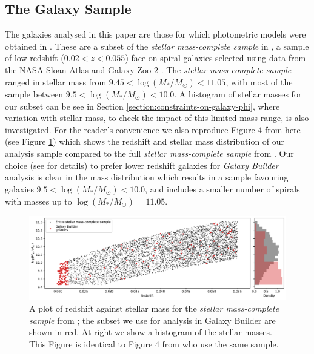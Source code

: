 \subsection{The Galaxy Sample}
The galaxies analysed in this paper are those for which photometric models were obtained in \citet{2020arXiv200610450L}. These are a subset of the \textit{stellar mass-complete sample} in \citet{2017MNRAS.472.2263H}, a sample of low-redshift ($0.02 < z < 0.055$) face-on spiral galaxies selected using data from the NASA-Sloan Atlas \citep{2011AJ....142...31B} and Galaxy Zoo 2 \citep{Willett2013:1308.3496v2}. The \textit{stellar mass-complete sample} ranged in stellar mass from $9.45 < \log(M_* / M_\odot) < 11.05$, with most of the sample between $9.5 < \log(M_* / M_\odot) < 10.0$. A histogram of stellar masses for our subset can be see in Section \ref{section:constraints-on-galaxy-phi}, where variation with stellar mass, to check the impact of this limited mass range, is also investigated. For the reader's convenience we also reproduce Figure 4 from \citet{2020arXiv200610450L} here (see Figure \ref{fig:stellarmass}) which shows the redshift and stellar mass distribution of our analysis sample compared to the full \textit{stellar mass-complete sample} from \citet{2017MNRAS.472.2263H}. Our choice (see \citet{2020arXiv200610450L} for details) to prefer lower redshift galaxies for {\it Galaxy Builder} analysis is clear in the mass distribution which results in a sample favouring galaxies $9.5 < \log(M_* / M_\odot) < 10.0$, and includes a smaller number of spirals with masses up to  $\log(M_* / M_\odot) = 11.05$. 

\begin{figure}
  \includegraphics[width=17.7cm]{plots/stellar_mass_selection_plot.pdf}
  \caption{A plot of redshift against stellar mass for the \textit{stellar mass-complete sample} from \citet{2017MNRAS.472.2263H}; the subset we use for analysis in Galaxy Builder are shown in red. At right we show a histogram of the stellar masses. This Figure is identical to Figure 4 from \citet{2020arXiv200610450L} who use the same sample.}
  \label{fig:stellarmass}
\end{figure}


